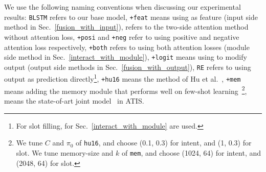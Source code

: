 We use the following naming conventions when discussing our experimental results:
%
\texttt{BLSTM} refers to our base model,
\texttt{+feat} means using \REtag as feature (input side method in Sec.~\ref{fusion_with_input}),
\ptatt refers to the two-side attention method without attention loss,
\texttt{+posi} and \texttt{+neg} refer to using positive and negative attention loss respectively, \texttt{+both} refers to using both attention losses (\NN module side method in Sec.~\ref{interact_with_module}),
\texttt{+logit} means using \REtag to modify \NN output (output side methods in Sec.~\ref{fusion_with_output}),
\texttt{RE} refers to using \RE output as prediction directly\footnote{
For slot filling, \REs for Sec.~\ref{interact_with_module} are used.},
\texttt{+hu16} means the method of Hu et al.~,
\texttt{+mem} means adding the memory module that performs well on few-shot learning~\cite{kaiser2017learning}\footnote{
We tune $C$ and $\pi_0$ of \texttt{hu16}, and choose (0.1, 0.3) for intent, and (1, 0.3) for slot. We tune memory-size and $k$ of \texttt{mem}, and choose (1024, 64) for intent, and (2048, 64) for slot.
},
\LL means the state-of-art joint model~\cite{liu2016attention} in ATIS.
